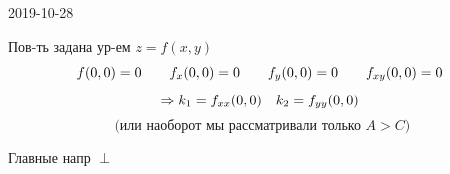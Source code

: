 \documentclass[12pt, fleqn]{article}
\begin{document}
\begin{lect}{2019-10-28}
    \begin{consequence}[1]
        Пов-ть задана ур-ем $z = f(x, y)$
        \[f(0, 0) = 0 \qquad f_x(0, 0) = 0 \qquad f_y(0, 0) = 0 \qquad f_{xy}(0, 0) = 0 \]
        \[\Rightarrow k_1 = f_{xx}(0, 0) \quad k_2 = f_{yy} (0, 0)\]
        \[\text{ (или наоборот мы
        рассматривали только } A > C)\]
    \end{consequence}

    \begin{consequence}[2]
        Главные напр $\perp$
    \end{consequence}
\end{lect}
\end{document}
